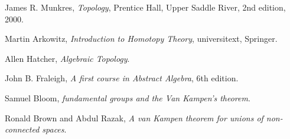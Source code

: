 \documentclass[letterpaper]{article}
\theoremstyle{definition}
\theoremstyle{plain}
\theoremstyle{plain}
\theoremstyle{plain}
\theoremstyle{plain}
\theoremstyle{remark}
\theoremstyle{remark}
\begin{document}
\begin{thebibliography}{9}

  James R. Munkres,
  \emph{Topology},
  Prentice Hall, Upper Saddle River,
  2nd edition,
  2000.

  Martin Arkowitz,
  \emph{Introduction to Homotopy Theory},
  universitext, Springer.

  Allen Hatcher,
  \emph{Algebraic Topology}.

  John B. Fraleigh,
  \emph{A first course in Abstract Algebra},
  6th edition.

  Samuel Bloom,
  \emph{fundamental  groups  and  the  Van  Kampen’s theorem}.

  Ronald Brown and Abdul Razak,
  \emph{A van Kampen theorem for unions of non-connected spaces}.
\end{thebibliography}
\end{document}
